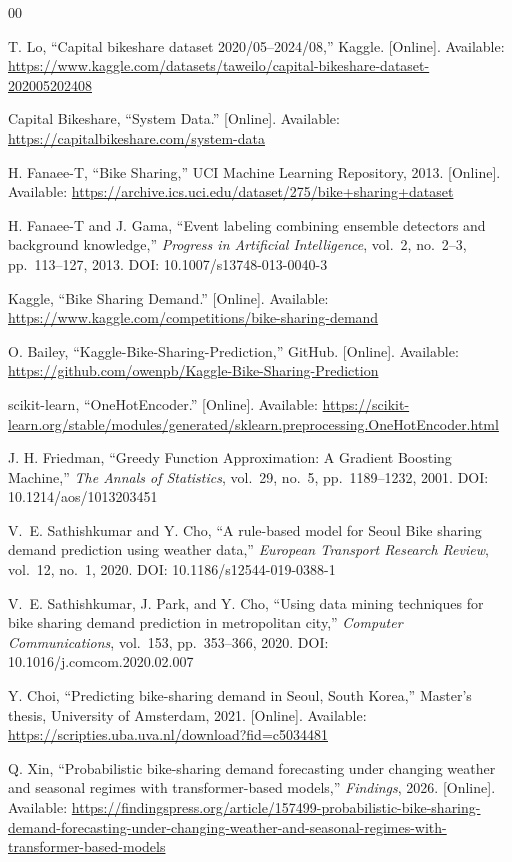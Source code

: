 \begin{thebibliography}{00}

T. Lo, ``Capital bikeshare dataset 2020/05--2024/08,'' Kaggle. [Online]. 
Available: \url{https://www.kaggle.com/datasets/taweilo/capital-bikeshare-dataset-202005202408}

Capital Bikeshare, ``System Data.'' [Online]. 
Available: \url{https://capitalbikeshare.com/system-data}

H. Fanaee-T, ``Bike Sharing,'' UCI Machine Learning Repository, 2013. 
[Online]. Available: \url{https://archive.ics.uci.edu/dataset/275/bike+sharing+dataset}

H. Fanaee-T and J. Gama, ``Event labeling combining ensemble detectors 
and background knowledge,'' \textit{Progress in Artificial Intelligence}, 
vol.~2, no.~2--3, pp.~113--127, 2013. DOI: 10.1007/s13748-013-0040-3

Kaggle, ``Bike Sharing Demand.'' [Online]. 
Available: \url{https://www.kaggle.com/competitions/bike-sharing-demand}

O. Bailey, ``Kaggle-Bike-Sharing-Prediction,'' GitHub. [Online]. 
Available: \url{https://github.com/owenpb/Kaggle-Bike-Sharing-Prediction}

scikit-learn, ``OneHotEncoder.'' [Online]. 
Available: \url{https://scikit-learn.org/stable/modules/generated/sklearn.preprocessing.OneHotEncoder.html}

J. H. Friedman, ``Greedy Function Approximation: A Gradient Boosting 
Machine,'' \textit{The Annals of Statistics}, vol.~29, no.~5, 
pp.~1189--1232, 2001. DOI: 10.1214/aos/1013203451

V.~E. Sathishkumar and Y. Cho, ``A rule-based model for Seoul Bike sharing 
demand prediction using weather data,'' \textit{European Transport Research 
Review}, vol.~12, no.~1, 2020. DOI: 10.1186/s12544-019-0388-1

V.~E. Sathishkumar, J. Park, and Y. Cho, ``Using data mining techniques 
for bike sharing demand prediction in metropolitan city,'' 
\textit{Computer Communications}, vol.~153, pp.~353--366, 2020. 
DOI: 10.1016/j.comcom.2020.02.007

Y. Choi, ``Predicting bike-sharing demand in Seoul, South Korea,'' 
Master's thesis, University of Amsterdam, 2021. [Online]. 
Available: \url{https://scripties.uba.uva.nl/download?fid=c5034481}

Q. Xin, ``Probabilistic bike-sharing demand forecasting under changing 
weather and seasonal regimes with transformer-based models,'' 
\textit{Findings}, 2026. [Online]. 
Available: \url{https://findingspress.org/article/157499-probabilistic-bike-sharing-demand-forecasting-under-changing-weather-and-seasonal-regimes-with-transformer-based-models}

\end{thebibliography}
